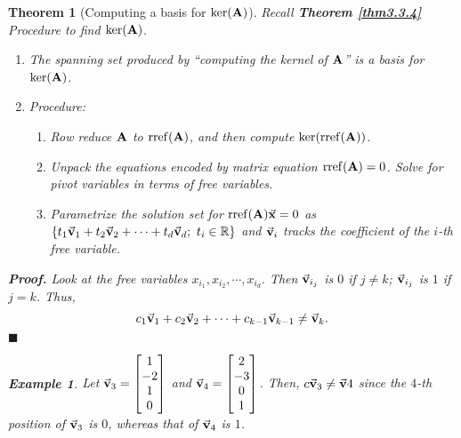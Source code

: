 \documentclass[12pt, a4paper]{article}
\newtheorem{thm}{Theorem}[subsection]
\newtheorem{eg}{Example}[subsection]
\newenvironment*{prf}{\par\indent\textbf{\textit{Proof. }}}{\hfill $\blacksquare$\par}
\def\R{{\mathbb{R}}}
\def\rref{\mathrm{rref}}
\def\vecx{\va{x}}
\def\vecv{\va{v}}
\def\matrixA{\vb{A}}
\begin{document}
\begin{thm}[Computing a basis for $\ker(\matrixA)$]
	Recall \textbf{Theorem \ref{thm3.3.4}} Procedure to find $\ker(\matrixA)$.
	\begin{enumerate}
		\item The spanning set produced by ``computing the kernel of $\matrixA$'' is a basis for $\ker(\matrixA)$.
		\item Procedure:
		\begin{enumerate}
			\item Row reduce $\matrixA$ to $\rref(\matrixA)$, and then compute $\ker(\rref(\matrixA))$.
			\item Unpack the equations encoded by matrix equation $\rref(\matrixA)=0$. Solve for pivot variables in terms of free variables.
			\item Parametrize the solution set for $\rref(\matrixA)\vecx=0$ as $\{t_1\vecv_1+t_2\vecv_2+\cdots+t_d\vecv_d;\ t_i\in\R\}$ and $\vecv_i$ tracks the coefficient of the $i$-th free variable.
		\end{enumerate}
	\end{enumerate}	
	\begin{prf}
		Look at the free variables $x_{i_1}, x_{i_2},\cdots,x_{i_d}.$ Then $\vecv_{i_j}$ is $0$ if $j\neq k$; $\vecv_{i_j}$ is $1$ if $j=k$. Thus, \[c_1\vecv_1+c_2\vecv_2+\cdots+c_{k-1}\vecv_{k-1}\neq\vecv_k.\]	
	\end{prf}
	\begin{eg}
		Let $\vecv_3=\begin{bmatrix}1\\-2\\1\\0\end{bmatrix}$ and $\vecv_4=\begin{bmatrix}2\\-3\\0\\1\end{bmatrix}$. Then, $c\vecv_3\neq\vecv4$ since the $4$-th position of $\vecv_3$ is $0$, whereas that of $\vecv_4$ is $1$.	
	\end{eg}
\end{thm}
\end{document}
